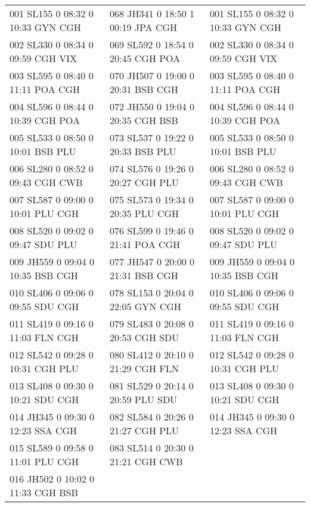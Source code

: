 \documentclass{endm}
\begin{document}
\begin{center}
\begin{longtable}{lll}
\scriptsize 001 SL155 0 08:32 0 10:33 GYN CGH & \scriptsize 068 JH341 0 18:50 1 00:19 JPA CGH & \scriptsize 001 SL155 0 08:32 0 10:33 GYN CGH\\
\scriptsize 002 SL330 0 08:34 0 09:59 CGH VIX & \scriptsize 069 SL592 0 18:54 0 20:45 CGH POA & \scriptsize 002 SL330 0 08:34 0 09:59 CGH VIX\\
\scriptsize 003 SL595 0 08:40 0 11:11 POA CGH & \scriptsize 070 JH507 0 19:00 0 20:31 BSB CGH & \scriptsize 003 SL595 0 08:40 0 11:11 POA CGH\\
\scriptsize 004 SL596 0 08:44 0 10:39 CGH POA & \scriptsize 072 JH550 0 19:04 0 20:35 CGH BSB & \scriptsize 004 SL596 0 08:44 0 10:39 CGH POA\\
\scriptsize 005 SL533 0 08:50 0 10:01 BSB PLU & \scriptsize 073 SL537 0 19:22 0 20:33 BSB PLU & \scriptsize 	005 SL533 0 08:50 0 10:01 BSB PLU\\
\scriptsize 006 SL280 0 08:52 0 09:43 CGH CWB & \scriptsize 074 SL576 0 19:26 0 20:27 CGH PLU & \scriptsize 006 SL280 0 08:52 0 09:43 CGH CWB\\
\scriptsize 007 SL587 0 09:00 0 10:01 PLU CGH & \scriptsize 075 SL573 0 19:34 0 20:35 PLU CGH & \scriptsize 007 SL587 0 09:00 0 10:01 PLU CGH\\
\scriptsize 008 SL520 0 09:02 0 09:47 SDU PLU & \scriptsize 076 SL599 0 19:46 0 21:41 POA CGH & \scriptsize 008 SL520 0 09:02 0 09:47 SDU PLU\\
\scriptsize 009 JH559 0 09:04 0 10:35 BSB CGH & \scriptsize 077 JH547 0 20:00 0 21:31 BSB CGH & \scriptsize 009 JH559 0 09:04 0 10:35 BSB CGH\\
\scriptsize 010 SL406 0 09:06 0 09:55 SDU CGH & \scriptsize 078 SL153 0 20:04 0 22:05 GYN CGH & \scriptsize 010 SL406 0 09:06 0 09:55 SDU CGH\\
\scriptsize 011 SL419 0 09:16 0 11:03 FLN CGH & \scriptsize 079 SL483 0 20:08 0 20:53 CGH SDU & \scriptsize 011 SL419 0 09:16 0 11:03 FLN CGH\\
\scriptsize 012 SL542 0 09:28 0 10:31 CGH PLU & \scriptsize 080 SL412 0 20:10 0 21:29 CGH FLN & \scriptsize 012 SL542 0 09:28 0 10:31 CGH PLU\\
\scriptsize 013 SL408 0 09:30 0 10:21 SDU CGH & \scriptsize 081 SL529 0 20:14 0 20:59 PLU SDU & \scriptsize 013 SL408 0 09:30 0 10:21 SDU CGH\\
\scriptsize 014 JH345 0 09:30 0 12:23 SSA CGH & \scriptsize 082 SL584 0 20:26 0 21:27 CGH PLU & \scriptsize 014 JH345 0 09:30 0 12:23 SSA CGH\\
\scriptsize 015 SL589 0 09:58 0 11:01 PLU CGH & \scriptsize 083 SL514 0 20:30 0 21:21 CGH CWB & \\
\scriptsize 016 JH502 0 10:02 0 11:33 CGH BSB & & \\

\end{longtable}

\end{center}
	
\end{document}
